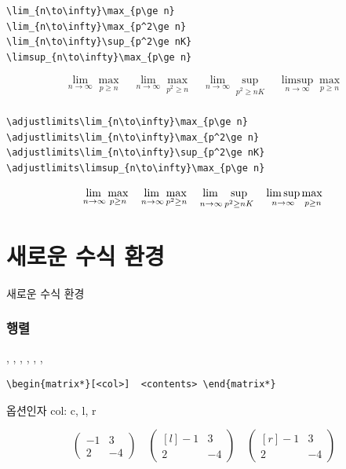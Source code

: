 \documentclass{beamer}
\begin{document}
\begin{frame}[fragile,t]
\frametitle{\texttt{\string\adjustlimits}}
\begin{verbatim}
\lim_{n\to\infty}\max_{p\ge n}
\lim_{n\to\infty}\max_{p^2\ge n} 
\lim_{n\to\infty}\sup_{p^2\ge nK} 
\limsup_{n\to\infty}\max_{p\ge n}
\end{verbatim}
\smallskip
{\Large
\[
\lim_{n\to\infty}\max_{p\ge n} \quad
\lim_{n\to\infty}\max_{p^2\ge n} \quad
\lim_{n\to\infty}\sup_{p^2\ge nK} \quad
\limsup_{n\to\infty}\max_{p\ge n}
\]
}
\end{frame}

\begin{frame}[fragile,t]
\frametitle{\texttt{\string\adjustlimits}}
\begin{verbatim}
\adjustlimits\lim_{n\to\infty}\max_{p\ge n}
\adjustlimits\lim_{n\to\infty}\max_{p^2\ge n} 
\adjustlimits\lim_{n\to\infty}\sup_{p^2\ge nK} 
\adjustlimits\limsup_{n\to\infty}\max_{p\ge n}
\end{verbatim}
\smallskip
{\Large
\[
\adjustlimits\lim_{n\to\infty}\max_{p\ge n} \quad
\adjustlimits\lim_{n\to\infty}\max_{p^2\ge n} \quad
\adjustlimits\lim_{n\to\infty}\sup_{p^2\ge nK} \quad
\adjustlimits\limsup_{n\to\infty}\max_{p\ge n}
\]
}
\end{frame}

\section{새로운 수식 환경}

\begin{frame}
\huge
\centering 새로운 수식 환경
\end{frame}

\begin{frame}[fragile, t]
\frametitle{행렬}
\texttt{\string\matrix*}, 
\texttt{\string\pmatrix*}, 
\texttt{\string\bmatrix*}, 
\texttt{\string\Bmatrix*}, 
\texttt{\string\vmatrix*}, 
\texttt{\string\Vmatrix*}, 

\begin{verbatim}
\begin{matrix*}[<col>]  <contents> \end{matrix*}
\end{verbatim}

옵션인자 col: \alert{c, l, r}

\[
\begin{pmatrix*}
-1&3\\2&-4
\end{pmatrix*}
\quad
\begin{pmatrix*}[l]
-1&3\\2&-4
\end{pmatrix*}
\quad
\begin{pmatrix*}[r]
-1&3\\2&-4
\end{pmatrix*}
\]
\vfill\vfill
\end{frame}
\end{document}
